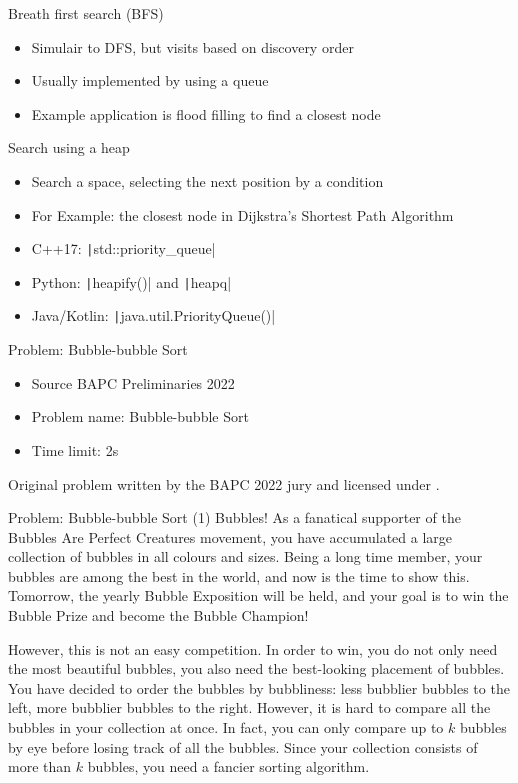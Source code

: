 \documentclass[11pt,pdf, aspectratio=169]{beamer}
\begin{document}
  \begin{frame}{Breath first search (BFS)}
    \begin{itemize}
      \item Simulair to DFS, but visits based on discovery order
      \item Usually implemented by using a queue
      \item Example application is flood filling to find a closest node
    \end{itemize}
  \end{frame}
  \begin{frame}{Search using a heap}
    \begin{itemize}
      \item Search a space, selecting the next position by a condition
      \item For Example: the closest node in Dijkstra's Shortest Path Algorithm
      \item C++17: \texttt|std::priority_queue|
      \item Python: \texttt|heapify()| and \texttt|heapq|
      \item Java/Kotlin: \texttt|java.util.PriorityQueue()|
    \end{itemize}
  \end{frame}
  \begin{frame}{Problem: Bubble-bubble Sort}
    \begin{itemize}
      \item Source BAPC Preliminaries 2022
      \item Problem name: Bubble-bubble Sort
      \item Time limit: 2s
    \end{itemize}
    Original problem written by the BAPC 2022 jury and licensed under \doclicenseLongNameRef.

    \doclicenseImage

  \end{frame}
  \begin{frame}{Problem: Bubble-bubble Sort (1)}
    Bubbles!
    As a fanatical supporter of the Bubbles Are Perfect Creatures movement, you have accumulated a large collection of bubbles in all colours and sizes.
    Being a long time member, your bubbles are among the best in the world, and now is the time to show this.
    Tomorrow, the yearly Bubble Exposition will be held, and your goal is to win the Bubble Prize and become the Bubble Champion!

    However, this is not an easy competition.
    In order to win, you do not only need the most beautiful bubbles, you also need the best-looking placement of bubbles.
    You have decided to order the bubbles by bubbliness: less bubblier bubbles to the left, more bubblier bubbles to the right.
    However, it is hard to compare all the bubbles in your collection at once. In fact, you can only compare up to $k$ bubbles by eye before losing track of all the bubbles.
    Since your collection consists of more than $k$ bubbles, you need a fancier sorting algorithm.


  \end{frame}
\end{document}
